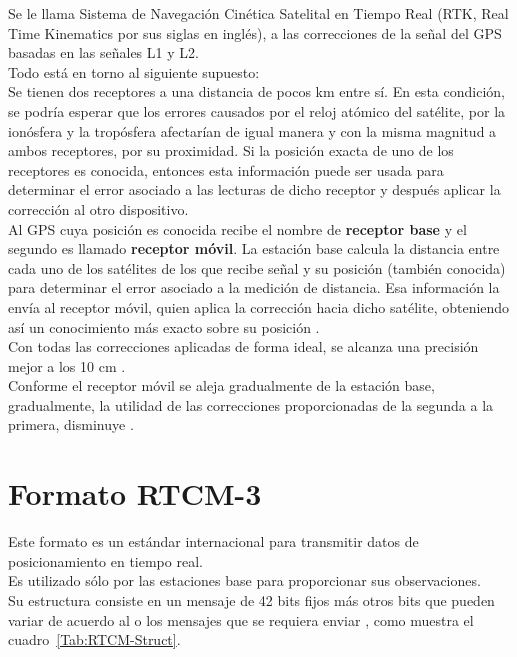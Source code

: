 Se le llama Sistema de Navegación Cinética Satelital en Tiempo Real (RTK, Real Time Kinematics por sus siglas en inglés), a las correcciones de la señal del GPS basadas en las señales L1 y L2. \\

Todo está en torno al siguiente supuesto: \\

Se tienen dos receptores a una distancia de pocos km entre sí. En esta condición, se podría esperar que los errores causados por el reloj atómico del satélite, por la ionósfera y la tropósfera afectarían de igual manera y con la misma magnitud a ambos receptores, por su proximidad. Si la posición exacta de uno de los receptores es conocida, entonces esta información puede ser usada para determinar el error asociado a las lecturas de dicho receptor y después aplicar la corrección al otro dispositivo. \\

Al GPS cuya posición es conocida recibe el nombre de \textbf{receptor base} y el segundo es llamado \textbf{receptor móvil}. La estación base calcula la distancia entre cada uno de los satélites de los que recibe señal y su posición (también conocida) para determinar el error asociado a la medición de distancia. Esa información la envía al receptor móvil, quien aplica la corrección hacia dicho satélite, obteniendo así un conocimiento más exacto sobre su posición \citep{fallas2002sistema}. \\

Con todas las correcciones aplicadas de forma ideal, se alcanza una precisión mejor a los 10 cm \citep{cerrato2011diseno}. \\

Conforme el receptor móvil se aleja gradualmente de la estación base, gradualmente, la utilidad de las correcciones proporcionadas de la segunda a la primera, disminuye \citep{mueller1994networked}.

\section{Formato RTCM-3}

Este formato es un estándar internacional para transmitir datos de posicionamiento en tiempo real. \\

Es utilizado sólo por las estaciones base para proporcionar sus observaciones. \\

Su estructura consiste en un mensaje de 42 bits fijos más otros bits que pueden variar de acuerdo al o los mensajes que se requiera enviar \citep{rubinov2011review}, como muestra el cuadro~\ref{Tab:RTCM-Struct}.\\

